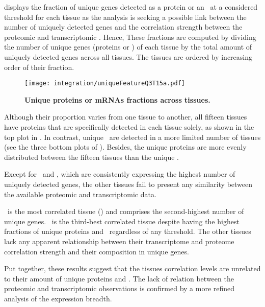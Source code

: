  displays the fraction of unique genes
detected as a protein or an \mRNA\ at a considered threshold for each tissue as
the analysis is seeking a possible link between
the number of uniquely detected genes
and the correlation strength between the proteomic and transcriptomic \treps{}.
Hence, These fractions are computed by dividing
the number of unique genes (proteins or \mRNAs) of each tissue
by the total amount of uniquely detected genes across all tissues.
The tissues are ordered by increasing order of their fraction.\mybr\

\begin{figure}[!htb]
    \texttt{[image: integration/uniqueFeatureQ3T15a.pdf]}\centering
    \vspace{-4mm}
    \caption[Unique proteins or mRNAs fractions across tissues]{\label{fig:UniqueFeatureQ3T15}
    \textbf{Unique proteins or mRNAs fractions across tissues.}
    }
\end{figure}

Although their proportion varies from one tissue to another,
all fifteen tissues have proteins
that are specifically detected in each tissue solely,
as shown in the top plot in .
In contrast, unique \mRNAs\ are detected in a more limited number of tissues
(see the three bottom plots of ).
Besides, the unique proteins are more evenly distributed
between the fifteen tissues than the unique \mRNAs.

Except for \Testis\ and \Liver,
which are consistently expressing the highest number of uniquely detected genes,
the other tissues fail to present any similarity
between the available proteomic and transcriptomic data.

\Liver\ is the most correlated tissue ()
and comprises the second-highest number of unique genes.
\Testis\ is the third-best correlated tissue
despite having the highest fractions of unique proteins and \mRNAs\
regardless of any threshold.
The other tissues lack any apparent relationship
between their transcriptome and proteome correlation strength
and their composition in unique genes.\mybr\

Put together, these results suggest that
the tissues correlation levels are unrelated
to their amount of unique proteins and \mRNAs{}.
The lack of relation between the proteomic and transcriptomic observations
is confirmed by a more refined analysis of the expression breadth.

